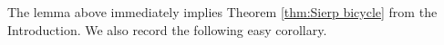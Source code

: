 \documentclass{amsart}
\theoremstyle{plain}
\newtheorem{lemma}[theorem]{Lemma}
\newtheorem{proposition}[theorem]{Proposition}
\theoremstyle{definition}
\theoremstyle{remark}
\newcommand{\reminder}[1]{\textsl{$\lhd\rhd$#1$\lhd\rhd$}\marginpar{$\lhd\rhd\lhd\rhd\lhd\rhd$}}%
\newcommand{\hide}[1]{}
\newcommand{\Fat}{{\mathcal F}}
\newcommand{\CC}{{\mathcal C}}
\newcommand{\cro}{{\operatorname{dec}}}
\begin{document}







The lemma above immediately implies Theorem \ref{thm:Sierp bicycle} from the Introduction. We also record the following easy corollary.






\end{document}

